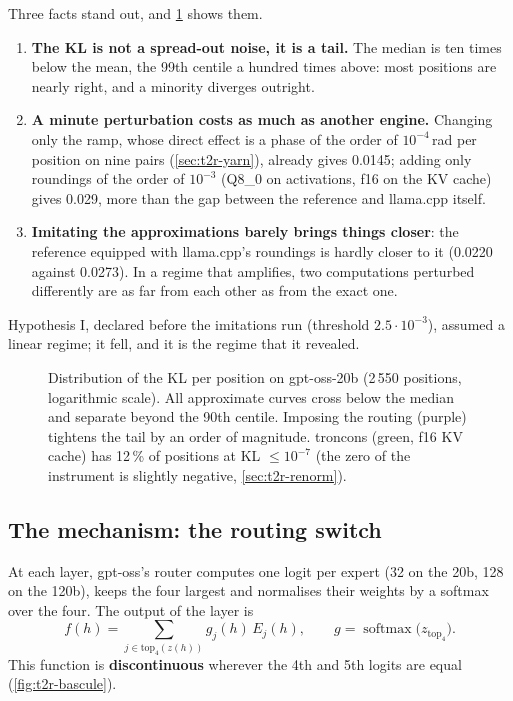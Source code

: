 Three facts stand out, and \cref{fig:t2r-repartition} shows them.
\begin{enumerate}
\item \textbf{The KL is not a spread-out noise, it is a tail.} The median is ten times below the mean, the 99th centile a hundred times above: most positions are nearly right, and a minority diverges outright.
\item \textbf{A minute perturbation costs as much as another engine.} Changing only the ramp, whose direct effect is a phase of the order of $10^{-4}$\,rad per position on nine pairs (\cref{sec:t2r-yarn}), already gives 0.0145; adding only roundings of the order of $10^{-3}$ (Q8\_0 on activations, f16 on the KV cache) gives 0.029, more than the gap between the reference and llama.cpp itself.
\item \textbf{Imitating the approximations barely brings things closer}: the reference equipped with llama.cpp's roundings is hardly closer to it (0.0220 against 0.0273). In a regime that amplifies, two computations perturbed differently are as far from each other as from the exact one.
\end{enumerate}
Hypothesis I, declared before the imitations run (threshold $2.5\cdot10^{-3}$), assumed a linear regime; it fell, and it is the regime that it revealed.

\begin{figure}[ht]
\centering
\GrapheRefRepartition
\caption[The KL per position is a tail]{Distribution of the KL per position on gpt-oss-20b (2\,550 positions, logarithmic scale). All approximate curves cross below the median and separate beyond the 90th centile. Imposing the routing (purple) tightens the tail by an order of magnitude. troncons (green, f16 KV cache) has 12\,\% of positions at KL $\le 10^{-7}$ (the zero of the instrument is slightly negative, \cref{sec:t2r-renorm}).}
\label{fig:t2r-repartition}
\end{figure}

\subsection{The mechanism: the routing switch}\label{sec:t2r-bascule}

At each layer, gpt-oss's router computes one logit per expert (32 on the 20b, 128 on the 120b), keeps the four largest and normalises their weights by a softmax over the four. The output of the layer is
\[
f(h) = \sum_{j \in \mathrm{top}_4(z(h))} g_j(h)\, E_j(h), \qquad g = \operatorname{softmax}\big(z_{\mathrm{top}_4}\big).
\]
This function is \textbf{discontinuous} wherever the 4th and 5th logits are equal (\cref{fig:t2r-bascule}).

